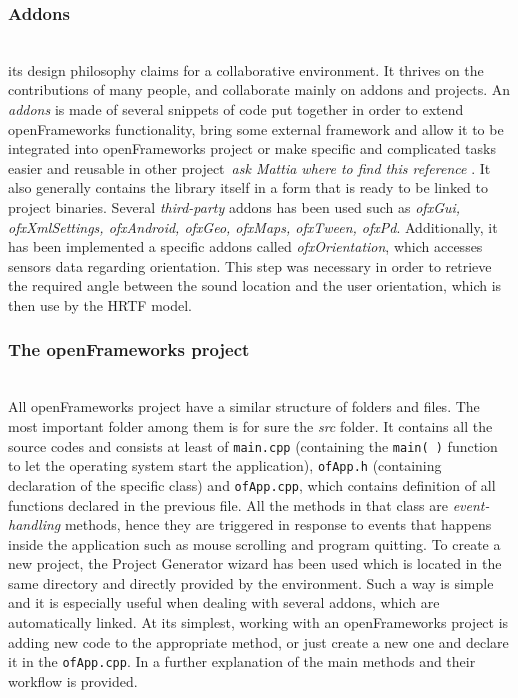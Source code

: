 \documentclass[journal]{IEEEtran}
\begin{document}
\begin{appendices}
\subsubsection{Addons}~\\
its design philosophy claims for a collaborative environment. It thrives on the contributions of many people, and collaborate mainly on addons and projects. An \emph{addons} is made of several snippets of code put together in order to extend openFrameworks functionality, bring some external framework and allow it to be integrated into openFrameworks project or make specific and complicated tasks easier and reusable in other project~\cite{}{\footnotesize{\textit{ask Mattia where to find this reference}}} . It also generally contains the library itself in a form that is ready to be linked to project binaries.
Several \textit{third-party} addons has been used such as \emph{ofxGui, ofxXmlSettings, ofxAndroid, ofxGeo, ofxMaps, ofxTween, ofxPd}. Additionally, it has been implemented a specific addons called \emph{ofxOrientation}, which accesses sensors data regarding orientation. This step was necessary in order to retrieve the required angle between the sound location and the user orientation, which is then use by the HRTF model.

\subsubsection{The openFrameworks project}~\\
All openFrameworks project have a similar structure of folders and files. The most important folder among them is for sure the \emph{src} folder. It contains all the source codes and consists at least of \texttt{main.cpp} (containing the \texttt{main( )} function to let the operating system start the application), \texttt{ofApp.h} (containing declaration of the specific class) and \texttt{ofApp.cpp}, which contains definition of all functions declared in the previous file. All the methods in that class are \emph{event-handling} methods, hence they are triggered in response to events that happens inside the application such as mouse scrolling and program quitting.%
To create a new project, the Project Generator wizard has been used which is located in the same directory and directly provided by the environment. Such a way is simple and it is especially useful when dealing with several addons, which are automatically linked. 
At its simplest, working with an openFrameworks project is adding new code to the appropriate method, or just create a new one and declare it in the \texttt{ofApp.cpp}. In a further explanation of the main methods and their workflow is provided.










\end{appendices}

\pagebreak



\end{document}
